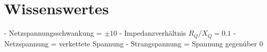 \section{Wissenswertes}

- Netzspannungsschwankung = $\pm 10 $
- Impedanzverhältnis $R_{Q}/X_{Q}=0.1$
- Netzspannung = verkettete Spannung
- Strangspannung = Spannung gegenüber 0